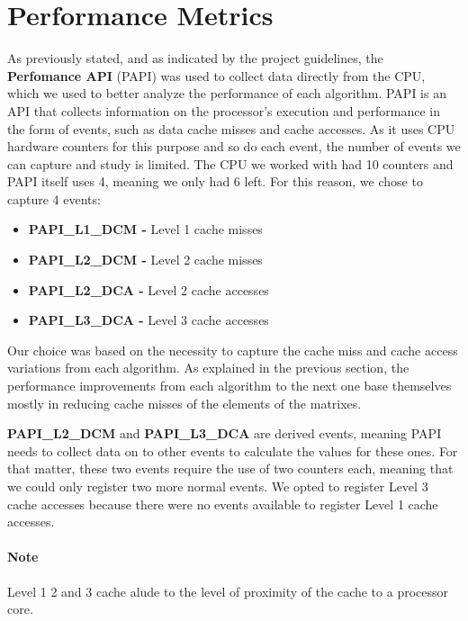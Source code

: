 \section{Performance Metrics}


As previously stated, and as indicated by the project guidelines, the \textbf{Perfomance API} (PAPI) was used to collect data directly from the CPU, which we used to better analyze the performance of each algorithm. 
PAPI is an API that collects information on the processor's execution and performance in the form of events, such as data cache misses and cache accesses. As it uses CPU hardware counters for this purpose and so do each event, the number of events we can capture and study is limited. The CPU we worked with had 10 counters and PAPI itself uses 4, meaning we only had 6 left. 
For this reason, we chose to capture 4 events:

\begin{itemize}
    \item \textbf{PAPI\_L1\_DCM - } Level 1 cache misses
    \item \textbf{PAPI\_L2\_DCM - } Level 2 cache misses
    \item \textbf{PAPI\_L2\_DCA - } Level 2 cache accesses
    \item \textbf{PAPI\_L3\_DCA - } Level 3 cache accesses
\end{itemize}

Our choice was based on the necessity to capture the cache miss and cache access variations from each algorithm. As explained in the previous section, the performance improvements from each algorithm to the next one base themselves mostly in reducing cache misses of the elements of the matrixes. 

\textbf{PAPI\_L2\_DCM} and \textbf{PAPI\_L3\_DCA} are derived events, meaning PAPI needs to collect data on to other events to calculate the values for these ones. For that matter, these two events require the use of two counters each, meaning that we could only register two more normal events. We opted to register Level 3 cache accesses because there were no events available to register Level 1 cache accesses. 

\paragraph{Note} Level 1 2 and 3 cache alude to the level of proximity of the cache to a processor core. 